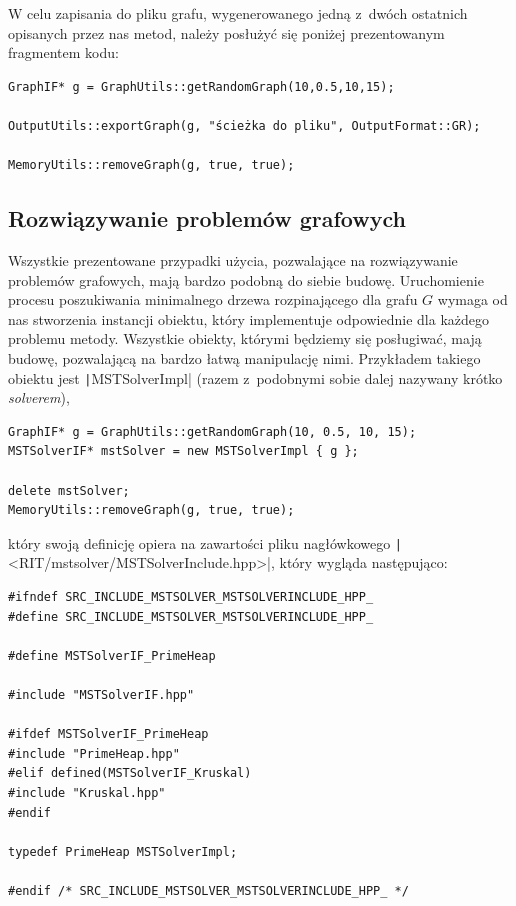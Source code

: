 W celu zapisania do pliku grafu, wygenerowanego jedną z~dwóch ostatnich opisanych przez nas metod, należy posłużyć się poniżej prezentowanym fragmentem kodu:

\begin{verbatim}
GraphIF* g = GraphUtils::getRandomGraph(10,0.5,10,15);

OutputUtils::exportGraph(g, "ścieżka do pliku", OutputFormat::GR);

MemoryUtils::removeGraph(g, true, true);
\end{verbatim}

\subsection{Rozwiązywanie problemów grafowych}

Wszystkie prezentowane przypadki użycia, pozwalające na rozwiązywanie problemów grafowych, mają bardzo podobną do siebie budowę. Uruchomienie procesu poszukiwania minimalnego drzewa rozpinającego dla grafu $G$ wymaga od nas stworzenia instancji obiektu, który implementuje odpowiednie dla każdego problemu metody. Wszystkie obiekty, którymi będziemy się posługiwać, mają budowę, pozwalającą na bardzo łatwą manipulację nimi. Przykładem takiego obiektu jest \texttt|MSTSolverImpl| (razem z~podobnymi sobie dalej nazywany krótko \textit{solverem}),

\begin{verbatim}
GraphIF* g = GraphUtils::getRandomGraph(10, 0.5, 10, 15);
MSTSolverIF* mstSolver = new MSTSolverImpl { g };

delete mstSolver;
MemoryUtils::removeGraph(g, true, true);
\end{verbatim}
który swoją definicję opiera na zawartości pliku nagłówkowego \texttt|<RIT/mstsolver/MSTSolverInclude.hpp>|, który wygląda następująco: 

\begin{verbatim}
#ifndef SRC_INCLUDE_MSTSOLVER_MSTSOLVERINCLUDE_HPP_
#define SRC_INCLUDE_MSTSOLVER_MSTSOLVERINCLUDE_HPP_

#define MSTSolverIF_PrimeHeap

#include "MSTSolverIF.hpp"

#ifdef MSTSolverIF_PrimeHeap
#include "PrimeHeap.hpp"
#elif defined(MSTSolverIF_Kruskal)
#include "Kruskal.hpp"
#endif

typedef PrimeHeap MSTSolverImpl;

#endif /* SRC_INCLUDE_MSTSOLVER_MSTSOLVERINCLUDE_HPP_ */
\end{verbatim}

